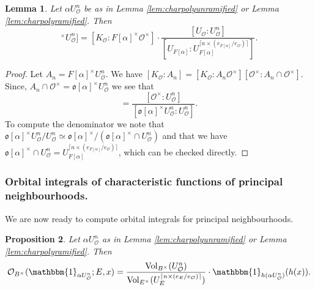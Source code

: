 \documentclass{article}
\newtheorem{lem}{Lemma}[section]
\newtheorem{prop}[lem]{Proposition}
\theoremstyle{named}
\renewcommand{\O}{\mathcal{O}}
\renewcommand{\o}{\mathfrak{o}}
\DeclareMathOperator{\vol}{Vol}
\begin{document}
\begin{lem}\label{lem:indexofcentralizer}
Let $\alpha U_\O^n$ be as in Lemma \ref{lem:charpolyunramified} or Lemma \ref{lem:charpolyramified}. Then
\begin{equation*}
    [K_\O: F[\alpha]^\times U_\O^n] = [K_\O: F[\alpha]^\times \O^\times] \cdot \frac{[U_\O: U_\O^n]}{[U_{F[\alpha]}: U_{{F[\alpha]}}^{\lceil n \times (e_{F[\alpha]}/e_\O)\rceil}]}.
\end{equation*}
\end{lem}
\begin{proof}
Let $A_n = F[\alpha]^\times U_\O^n$. We have $[K_\O: A_n] = [K_\O: A_n\O^\times][\O^\times : A_n \cap \O^\times]$. 
Since, $A_n \cap \O^\times = \o[\alpha]^\times U_\O^n$ we see that 
\begin{equation*}
    [\O^\times : A_n \cap \O^\times] = \frac{[\O^\times: U_\O^n]}{[ \o[\alpha]^\times U_\O^n: U_\O^n]}.
\end{equation*}
To compute the denominator we note that $\o[\alpha]^\times U_\O^n/U_\O^n \simeq \o[\alpha]^\times / \left(\o[\alpha]^\times \cap U_\O^n\right)$ and that we have $\o[\alpha]^\times \cap U_\O^n = U_{{F[\alpha]}}^{\lceil n \times (e_{F[\alpha]}/e_\O)\rceil}$, which can be checked directly.
\end{proof}

\subsubsection{Orbital integrals of characteristic functions of principal neighbourhoods.}
We are now ready to compute orbital integrals for principal neighbourhoods. 

\begin{prop}\label{prop:orbitalintegralneighbourhood}
Let $\alpha U_\O^n$ as in Lemma \ref{lem:charpolyunramified} or Lemma \ref{lem:charpolyramified}. Then 
\begin{equation}\label{eq:orbitalintegralneighbourhood}
    \O_{B^\times}(\mathbbm{1}_{\alpha U_\O^n}; E, x) = \frac{\vol_{B^\times}(U_\O^n)}{\vol_{E^\times}(U_E^{\lceil n \times (e_{E}/e_\O)\rceil})} \cdot \mathbbm{1}_{h(\alpha U_\O^n)}(h(x)).
\end{equation} 
\end{prop}
\end{document}
